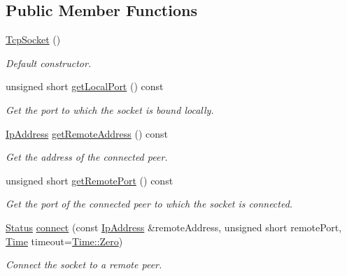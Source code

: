 \subsection*{Public Member Functions}
\begin{DoxyCompactItemize}
\item 
\hypertarget{classsf_1_1TcpSocket_a62a9bf81fd7f15fedb29fd1348483236}{\hyperlink{classsf_1_1TcpSocket_a62a9bf81fd7f15fedb29fd1348483236}{Tcp\-Socket} ()}\label{classsf_1_1TcpSocket_a62a9bf81fd7f15fedb29fd1348483236}

\begin{DoxyCompactList}\small\item\em Default constructor. \end{DoxyCompactList}\item 
unsigned short \hyperlink{classsf_1_1TcpSocket_ab47eeb1cb71f2f251a83bc823773f1b3}{get\-Local\-Port} () const 
\begin{DoxyCompactList}\small\item\em Get the port to which the socket is bound locally. \end{DoxyCompactList}\item 
\hyperlink{classsf_1_1IpAddress}{Ip\-Address} \hyperlink{classsf_1_1TcpSocket_a7904ca6ab9e018021e305a3aeb7a1b9a}{get\-Remote\-Address} () const 
\begin{DoxyCompactList}\small\item\em Get the address of the connected peer. \end{DoxyCompactList}\item 
unsigned short \hyperlink{classsf_1_1TcpSocket_abc05220e06f1522144cecab822e79296}{get\-Remote\-Port} () const 
\begin{DoxyCompactList}\small\item\em Get the port of the connected peer to which the socket is connected. \end{DoxyCompactList}\item 
\hyperlink{classsf_1_1Socket_a51bf0fd51057b98a10fbb866246176dc}{Status} \hyperlink{classsf_1_1TcpSocket_a68cd42d5ab70ab54b16787f555951c40}{connect} (const \hyperlink{classsf_1_1IpAddress}{Ip\-Address} \&remote\-Address, unsigned short remote\-Port, \hyperlink{classsf_1_1Time}{Time} timeout=\hyperlink{classsf_1_1Time_a8db127b632fa8da21550e7282af11fa0}{Time\-::\-Zero})
\begin{DoxyCompactList}\small\item\em Connect the socket to a remote peer. \end{DoxyCompactList}\item 

\end{DoxyCompactItemize}
